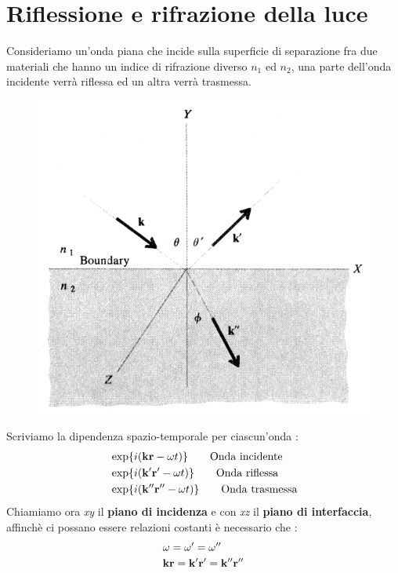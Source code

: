 \chapter{Riflessione e rifrazione della luce}
Consideriamo un'onda piana che incide sulla superficie di separazione fra due materiali
che hanno un indice di rifrazione diverso $n_{1}$ ed $n_{2}$, una parte dell'onda incidente 
verrà riflessa ed un altra verrà trasmessa.
\begin{figure}[!h]
    \centering
    \includegraphics[scale=0.5]{riflessione/Riflessione1}
\end{figure}
Scriviamo la dipendenza spazio-temporale per ciascun'onda :
\begin{align*}
    &\exp{i(\vb{k}\vb{r}-\omega t)} \tag*{Onda incidente}\\
    &\exp{i(\vb{k}^{\prime}\vb{r}^{\prime} - \omega t)}\tag*{Onda riflessa}\\
    &\exp{i(\vb{k}^{\prime\prime}\vb{r}^{\prime\prime}-\omega t)}\tag*{Onda trasmessa}
\end{align*}
Chiamiamo ora \textit{xy} il \textbf{piano di incidenza} e con \textit{xz} il \textbf{piano di interfaccia},
affinchè ci possano essere relazioni costanti è necessario che :
\begin{align*}
    &\omega = \omega^{\prime} = \omega^{\prime\prime} \\
    &\vb{k}\vb{r} = \vb{k}^{\prime}\vb{r}^{\prime} = \vb{k}^{\prime\prime}\vb{r}^{\prime\prime}
\end{align*}
